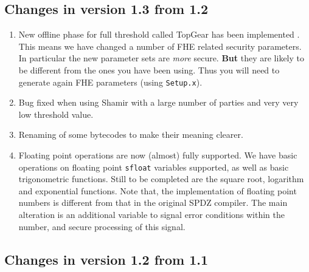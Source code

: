 \subsection{Changes in version 1.3 from 1.2}
\begin{enumerate}
\item New offline phase for full threshold called TopGear has been
implemented \cite{TopGear}. This means we have changed a number
of FHE related security parameters. In particular the new parameter
sets are {\em more} secure.
{\bf But} they are likely to be different from the ones you have
been using. Thus you will need to generate again FHE parameters
(using \verb+Setup.x+).
\item Bug fixed when using Shamir with a large number of parties
and very very low threshold value.
\item Renaming of some bytecodes to make their meaning clearer.
\item Floating point operations are now (almost) fully supported.
We have basic operations on floating point \verb+sfloat+ variables
supported, as well as basic trigonometric functions. Still to
be completed are the square root, logarithm and exponential functions.
Note that, the implementation of floating point numbers is
different from that in the original SPDZ compiler. The main alteration
is an additional variable to signal error conditions within the
number, and secure processing of this signal.
\end{enumerate}


\subsection{Changes in version 1.2 from 1.1}

